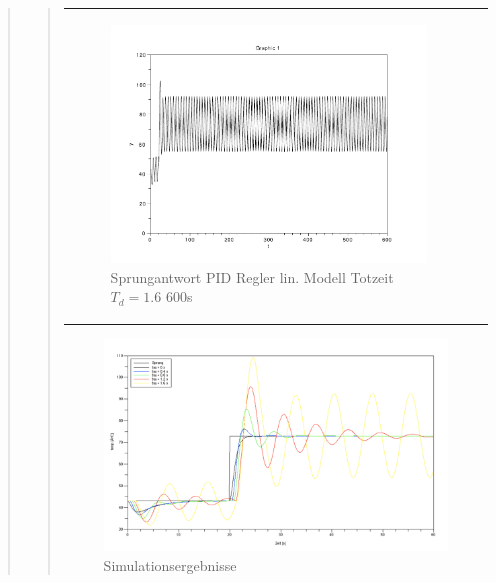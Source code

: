 \begin{quote}
\begin{quote}
\begin{center}
\begin{tabular}{ll}
                    \begin{minipage}{0.6\textwidth}
                        \begin{figure}[H]
                            \includegraphics[scale=0.4,trim = 0cm 0cm 0cm
                            0cm, clip]
                            {./Bilder/4_1_Td_16_600s}
                              \caption{Sprungantwort PID Regler lin. Modell Totzeit $T_d = 1.6$ 600s}
                        \end{figure}
                    \end{minipage}
                
                \end{tabular}
            \end{center}
            
            \vspace{1em}
            
            
        \begin{figure}[H]
        \centering
            \includegraphics[scale=0.4, trim = 0cm 0cm 0cm 0cm, clip]{./Bilder/4_1_Simulation}
                \caption{Simulationsergebnisse}
        \end{figure}
        

\end{quote}
\end{quote}
